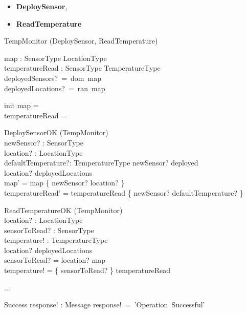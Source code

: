 \documentclass[12pt]{article}
\begin{document}
\begin{itemize}
	\item \textbf{DeploySensor},
	\item \textbf{ReadTemperature}
\end{itemize}

\newpage

\begin{class}{TempMonitor}
\also
\upharpoonright (DeploySensor, ReadTemperature) \\
\begin{state}
map : SensorType \pfun LocationType\\
temperatureRead : SensorType \pfun TemperatureType\\
\where
deployedSensors?~=~dom~map\\
deployedLocations?~=~ran~map\\
\end{state}
\end{class}
\begin{class}{init}
map = \emptyset\\
temperatureRead = \emptyset
\end{class}
\begin{class}{DeploySensorOK}
\Delta (TempMonitor) \\
newSensor? : SensorType\\
location? : LocationType\\
defaultTemperature?: TemperatureType
\ST
newSensor? \notin deployed\\
location? \notin deployedLocations\\
map' = map \cup \{ newSensor? \mapsto location? \}\\
temperatureRead' = temperatureRead \cup \{ newSensor? \mapsto defaultTemperature? \}
\end{class}
\begin{class}{ReadTemperatureOK}
\Xi (TempMonitor) \\
location? : LocationType\\
sensorToRead? : SensorType\\
temperature! : TemperatureType\\
\ST
location? \in deployedLocations\\
sensorToRead? = {location?} \triangleleft map\\
temperature! = \{ sensorToRead? \} \triangleright  temperatureRead\\
\end{class}
...\\
\begin{class}{Success}
response! : Message
\ST
response!~=~'Operation~Successful'
\end{class}
\end{document}
